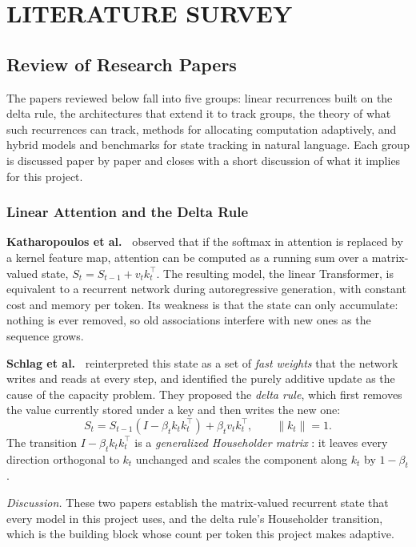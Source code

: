 \chapter{LITERATURE SURVEY}
\label{chap:lit}
\section{Review of Research Papers}
\label{sec:review}
The papers reviewed below fall into five groups: linear recurrences built on the delta rule, the architectures that extend it to track groups, the theory of what such recurrences can track, methods for allocating computation adaptively, and hybrid models and benchmarks for state tracking in natural language. Each group is discussed paper by paper and closes with a short discussion of what it implies for this project.

\subsection{Linear Attention and the Delta Rule}
\textbf{Katharopoulos et al.\ \cite{lineartransformers}} observed that if the softmax in attention is replaced by a kernel feature map, attention can be computed as a running sum over a matrix-valued state, $S_t = S_{t-1} + v_t k_t^\top$. The resulting model, the linear Transformer, is equivalent to a recurrent network during autoregressive generation, with constant cost and memory per token. Its weakness is that the state can only accumulate: nothing is ever removed, so old associations interfere with new ones as the sequence grows.

\textbf{Schlag et al.\ \cite{fastweight}} reinterpreted this state as a set of \emph{fast weights} that the network writes and reads at every step, and identified the purely additive update as the cause of the capacity problem. They proposed the \emph{delta rule}, which first removes the value currently stored under a key and then writes the new one:
\begin{equation}
S_t = S_{t-1}\left(I - \beta_t k_t k_t^\top\right) + \beta_t v_t k_t^\top, \qquad \lVert k_t\rVert = 1 .
\label{eq:deltarule}
\end{equation}
The transition $I - \beta_t k_t k_t^\top$ is a \emph{generalized Householder matrix} \cite{householder}: it leaves every direction orthogonal to $k_t$ unchanged and scales the component along $k_t$ by $1-\beta_t$.

\textit{Discussion.} These two papers establish the matrix-valued recurrent state that every model in this project uses, and the delta rule's Householder transition, which is the building block whose count per token this project makes adaptive.

